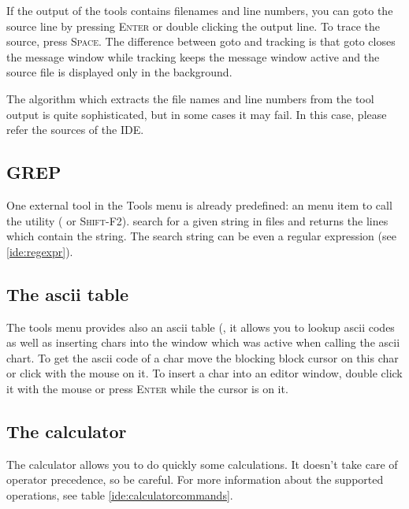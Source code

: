If the output of the tools contains filenames and line numbers,
you can goto the source line by pressing \textsc{Enter} or
double clicking the output line. To trace the source, press
\textsc{Space}. The difference between goto and tracking is that
goto closes the message window while tracking keeps the message
window active and the source file is displayed only in the background.

The algorithm which extracts the file names and line numbers from
the tool output is quite sophisticated, but in some cases it may
fail. In this case, please refer the sources of the IDE.

\subsection{GREP}
One external tool in the Tools menu is already predefined: an
menu item to call the  utility ( or
\textsc{Shift-F2}).  search for a given string in files and
returns the lines which contain the string. The search string can
be even a regular expression (see \ref{ide:regexpr}).

\subsection{The ascii table}
The tools menu provides also an ascii table (,
it allows you to lookup ascii codes as well as
inserting chars into the window which was active when calling the
ascii chart. To get the ascii code of a char move the blocking block
cursor on this char or click with the mouse on it. To insert a
char into an editor window, double click it with the mouse
or press \textsc{Enter} while the cursor is on it.

\subsection{The calculator}
The calculator allows you to do quickly some calculations. It doesn't
take care of operator precedence, so be careful. For more information
about the supported operations, see table \ref{ide:calculatorcommands}.

